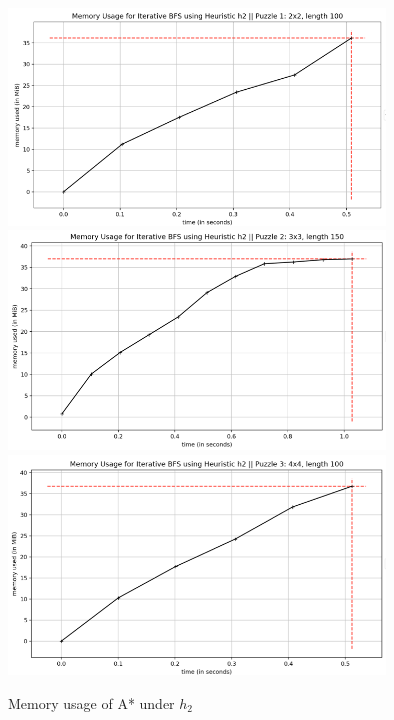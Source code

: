 \documentclass[runningheads]{llncs}
\begin{document}
\begin{figure}
    \begin{center}
        \includegraphics[width=10cm]{images/bfs-2x2-h2.png}
        \includegraphics[width=10cm]{images/bfs-3x3-h2.png}
        \includegraphics[width=10cm]{images/bfs-4x4-h2.png}
        \caption{Memory usage of A* under $h_2$} \label{fig3}
    \end{center}
\end{figure}
    
\end{document}
